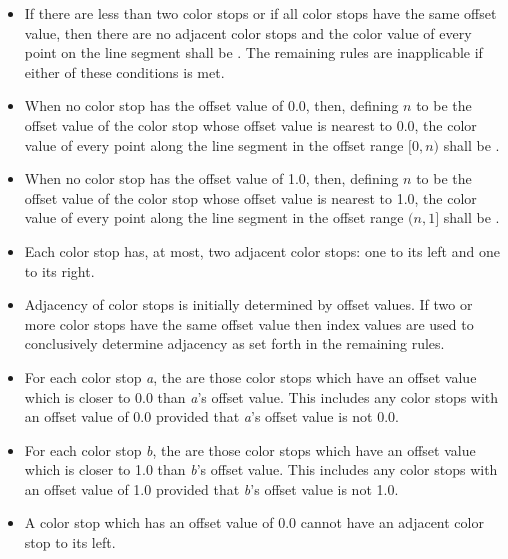 \begin{itemize}
\item If there are less than two color stops or if all color stops have the same offset value, then there are no adjacent color stops and the color value of every point on the line segment shall be . The remaining rules are inapplicable if either of these conditions is met.

\item When no color stop has the offset value of 0.0, then, defining $n$ to be the offset value of the color stop whose offset value is nearest to 0.0, the color value of every point along the line segment in the offset range $[0, n)$ shall be .

\item When no color stop has the offset value of 1.0, then, defining $n$ to be the offset value of the color stop whose offset value is nearest to 1.0, the color value of every point along the line segment in the offset range $(n, 1]$ shall be .

\item Each color stop has, at most, two adjacent color stops: one to its left and one to its right.

\item Adjacency of color stops is initially determined by offset values. If two or more color stops have the same offset value then index values are used to conclusively determine adjacency as set forth in the remaining rules.

\item For each color stop \textit{a}, the  are those color stops which have an offset value which is closer to 0.0 than \textit{a}'s offset value.
\enternote
This includes any color stops with an offset value of 0.0 provided that \textit{a}'s offset value is not 0.0.
\exitnote

\item For each color stop \textit{b}, the  are those color stops which have an offset value which is closer to 1.0 than \textit{b}'s offset value.
\enternote
This includes any color stops with an offset value of 1.0 provided that \textit{b}'s offset value is not 1.0.
\exitnote

\item A color stop which has an offset value of 0.0 cannot have an adjacent color stop to its left.


\end{itemize}
